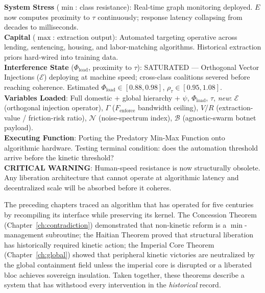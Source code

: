 \begin{tcolorbox}[colback=black!5, colframe=black!70, fonttitle=\bfseries\ttfamily, title=RUNTIME LOG: ALGORITHMIC EPOCH (TERMINAL RACE{,} 2010s--PRESENT)]
\ttfamily\small
\textbf{System Stress} ($\min$: class resistance): Real-time graph monitoring deployed. $E$ now computes proximity to $\tau$ continuously; response latency collapsing from decades to milliseconds.\\
\textbf{Capital} ($\max$: extraction output): Automated targeting operative across lending{,} sentencing{,} housing{,} and labor-matching algorithms. Historical extraction priors hard-wired into training data.\\
\textbf{Interference State} ($\Phi_{\text{load}}$, proximity to $\tau$): SATURATED --- Orthogonal Vector Injections ($\mathcal{E}$) deploying at machine speed; cross-class coalitions severed before reaching coherence. Estimated $\Phi_{\text{load}} \in [0.88, 0.98]$, $\rho_{\tau} \in [0.95, 1.08]$.\\
\textbf{Variables Loaded}: Full domestic + global hierarchy + $\psi${,} $\Phi_{\text{load}}${,} $\tau${,} \textit{new}: $\mathcal{E}$ (orthogonal injection operator){,} $\Gamma$ ($F_{\text{enforce}}$ bandwidth ceiling){,} $V$/$R$ (extraction-value / friction-risk ratio){,} $\mathcal{N}$ (noise-spectrum index){,} $\mathcal{B}$ (agnostic-swarm botnet payload).\\
\textbf{Executing Function}: Porting the Predatory Min-Max Function onto algorithmic hardware. Testing terminal condition: does the automation threshold arrive before the kinetic threshold?\\
\textbf{CRITICAL WARNING}: Human-speed resistance is now structurally obsolete. Any liberation architecture that cannot operate at algorithmic latency and decentralized scale will be absorbed before it coheres.
\end{tcolorbox}

\medskip

The preceding chapters traced an algorithm that has operated for five centuries by recompiling its interface while preserving its kernel. The Concession Theorem (Chapter~\ref{ch:contradiction}) demonstrated that non-kinetic reform is a $\min$-management subroutine; the Haitian Theorem proved that structural liberation has historically required kinetic action; the Imperial Core Theorem (Chapter~\ref{ch:global}) showed that peripheral kinetic victories are neutralized by the global containment field unless the imperial core is disrupted or a liberated bloc achieves sovereign insulation. Taken together, these theorems describe a system that has withstood every intervention in the \textit{historical} record.


